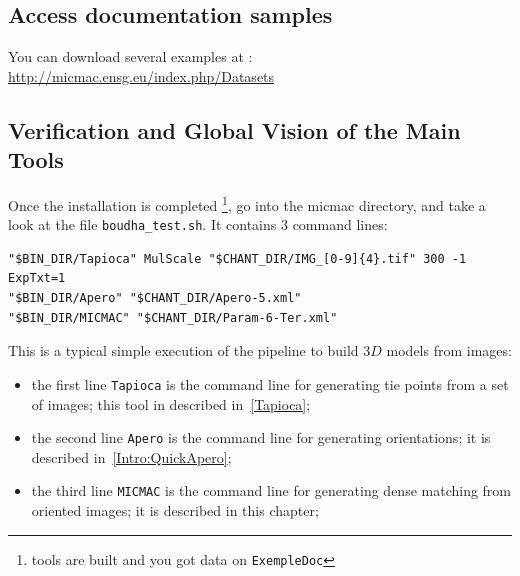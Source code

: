 \subsection{Access documentation samples}

You can download several examples at : \url{http://micmac.ensg.eu/index.php/Datasets}







\subsection{Verification and Global Vision of the Main Tools}

\label{SHEL:TEST:BOUDHA}

Once the installation is completed \footnote{tools are built and you got data
on {\tt ExempleDoc}}, go into the micmac directory,
and take a look at the file {\tt boudha\_test.sh}. It contains
$3$ command lines:

{\scriptsize
\begin{verbatim}
"$BIN_DIR/Tapioca" MulScale "$CHANT_DIR/IMG_[0-9]{4}.tif" 300 -1 ExpTxt=1
"$BIN_DIR/Apero" "$CHANT_DIR/Apero-5.xml"
"$BIN_DIR/MICMAC" "$CHANT_DIR/Param-6-Ter.xml"
\end{verbatim}
}

This is a typical simple execution of the pipeline to build $3D$ models from images:

\begin{itemize}
    \item the first line {\tt Tapioca} is the command line for generating tie points
          from a set of images; this tool in described in~\ref{Tapioca};

    \item the second line {\tt Apero} is the command line for generating orientations;
           it is described in~\ref{Intro:QuickApero};

    \item the third line {\tt MICMAC} is the command line for generating dense
          matching from oriented images; it is described in this chapter;
\end{itemize}



